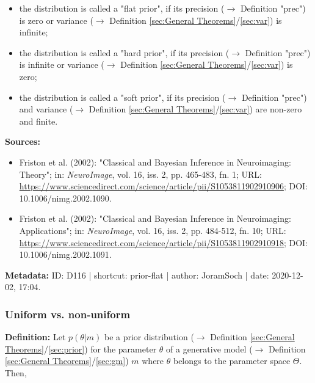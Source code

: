 \documentclass[a4paper,12pt,twoside]{book}
\begin{document}
\begin{itemize}

\item the distribution is called a "flat prior", if its precision ($\rightarrow$ Definition "prec") is zero or variance ($\rightarrow$ Definition \ref{sec:General Theorems}/\ref{sec:var}) is infinite;

\item the distribution is called a "hard prior", if its precision ($\rightarrow$ Definition "prec") is infinite or variance ($\rightarrow$ Definition \ref{sec:General Theorems}/\ref{sec:var}) is zero;

\item the distribution is called a "soft prior", if its precision ($\rightarrow$ Definition "prec") and variance ($\rightarrow$ Definition \ref{sec:General Theorems}/\ref{sec:var}) are non-zero and finite.

\end{itemize}


\vspace{1em}
\textbf{Sources:}
\begin{itemize}
\item Friston et al. (2002): "Classical and Bayesian Inference in Neuroimaging: Theory"; in: \textit{NeuroImage}, vol. 16, iss. 2, pp. 465-483, fn. 1; URL: \url{https://www.sciencedirect.com/science/article/pii/S1053811902910906}; DOI: 10.1006/nimg.2002.1090.
\item Friston et al. (2002): "Classical and Bayesian Inference in Neuroimaging: Applications"; in: \textit{NeuroImage}, vol. 16, iss. 2, pp. 484-512, fn. 10; URL: \url{https://www.sciencedirect.com/science/article/pii/S1053811902910918}; DOI: 10.1006/nimg.2002.1091.
\end{itemize}


\vspace{1em}
\textbf{Metadata:} ID: D116 | shortcut: prior-flat | author: JoramSoch | date: 2020-12-02, 17:04.
\vspace{1em}



\subsubsection[\textit{Uniform vs. non-uniform}]{Uniform vs. non-uniform} \label{sec:prior-uni}
\setcounter{equation}{0}

\textbf{Definition:} Let $p(\theta \vert m)$ be a prior distribution ($\rightarrow$ Definition \ref{sec:General Theorems}/\ref{sec:prior}) for the parameter $\theta$ of a generative model ($\rightarrow$ Definition \ref{sec:General Theorems}/\ref{sec:gm}) $m$ where $\theta$ belongs to the parameter space $\Theta$. Then,
\end{document}
